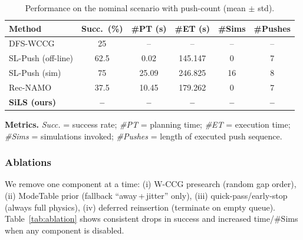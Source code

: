 \begin{table}[t]
  \centering
  \begin{threeparttable}
  \caption{Performance on the nominal scenario with push-count (mean $\pm$ std).}
  \label{tab:main-push}
  \vspace{2pt}
  
  \setlength{\tabcolsep}{2.3pt} %
  
  \begin{tabular}{lccccc}
  \toprule
  Method & Succ.~(\%) & \#PT (s) & \#ET (s) & \#Sims & \#Pushes \\
  \midrule
  DFS-WCCG            & 25 & -- & -- & -- & -- \\
  SL-Push (off-line)  & 62.5 & 0.02 & 145.147 & 0 & 7 \\
  SL-Push (sim)       & 75 & 25.09 & 246.825 & 16 & 8 \\
  Rec-NAMO            & 37.5 & 10.45 & 179.262 & 0 & 7 \\
  \textbf{SiLS (ours)}& \textbf{--} & \textbf{--} & \textbf{--} & \textbf{--} & \textbf{--} \\
  \bottomrule
  \end{tabular}
  
  \begin{tablenotes}[flushleft]\footnotesize
  \item \textbf{Metrics.} \emph{Succ.} = success rate; \emph{\#PT} = planning time; \emph{\#ET} = execution time;
  \emph{\#Sims} = simulations invoked; \emph{\#Pushes} = length of executed push sequence.
  \end{tablenotes}
  \end{threeparttable}
  \end{table}
  


\subsubsection{Ablations}
\label{subsec:ablations}
We remove one component at a time: (i) W-CCG presearch (random gap order),
(ii) ModeTable prior (fallback “away\,+\,jitter” only),
(iii) quick-pass/early-stop (always full physics),
(iv) deferred reinsertion (terminate on empty queue).
Table~\ref{tab:ablation} shows consistent drops in success and increased
time/\#Sims when any component is disabled.

